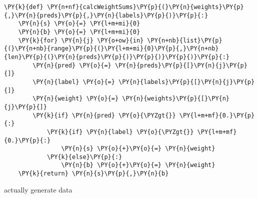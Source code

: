 {\par%
\vspace{-1\baselineskip}%
}%
\begin{notebookcell}[]%
\begin{addmargin}[\cellleftmargin]{0em}%
{\smaller%
\par%
%
\vspace{-1\smallerfontscale}%
\begin{Verbatim}[commandchars=\\\{\}]
\PY{k}{def} \PY{n+nf}{calcWeightSums}\PY{p}{(}\PY{n}{weights}\PY{p}{,}\PY{n}{preds}\PY{p}{,}\PY{n}{labels}\PY{p}{)}\PY{p}{:}
    \PY{n}{s} \PY{o}{=} \PY{l+m+mi}{0}
    \PY{n}{b} \PY{o}{=} \PY{l+m+mi}{0}
    \PY{k}{for} \PY{n}{j} \PY{o+ow}{in} \PY{n+nb}{list}\PY{p}{(}\PY{n+nb}{range}\PY{p}{(}\PY{l+m+mi}{0}\PY{p}{,}\PY{n+nb}{len}\PY{p}{(}\PY{n}{preds}\PY{p}{)}\PY{p}{)}\PY{p}{)}\PY{p}{:}
        \PY{n}{pred} \PY{o}{=} \PY{n}{preds}\PY{p}{[}\PY{n}{j}\PY{p}{]}
        \PY{n}{label} \PY{o}{=} \PY{n}{labels}\PY{p}{[}\PY{n}{j}\PY{p}{]}
        \PY{n}{weight} \PY{o}{=} \PY{n}{weights}\PY{p}{[}\PY{n}{j}\PY{p}{]}
        \PY{k}{if} \PY{n}{pred} \PY{o}{\PYZgt{}} \PY{l+m+mf}{0.}\PY{p}{:}
            \PY{k}{if} \PY{n}{label} \PY{o}{\PYZgt{}} \PY{l+m+mf}{0.}\PY{p}{:}
                \PY{n}{s} \PY{o}{+}\PY{o}{=} \PY{n}{weight}
            \PY{k}{else}\PY{p}{:}
                \PY{n}{b} \PY{o}{+}\PY{o}{=} \PY{n}{weight}
    \PY{k}{return} \PY{n}{s}\PY{p}{,}\PY{n}{b}
\end{Verbatim}
%
\par%
\vspace{-1\smallerfontscale}}%
\end{addmargin}
\end{notebookcell}


    actually generate data



